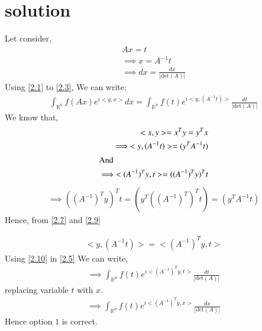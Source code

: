 \documentclass[journal,12pt,twocolumn]{IEEEtran}
\numberwithin{table}{section}
\begin{document}
	\section{solution}
Let consider,
\begin{align}
Ax = t \label{2.1}\\
\implies x = A^{-1}t \label{2.2}\\
\implies dx = \frac{dx}{ \left | \text{det} (A) \right |} \label{2.3}
\end{align}
Using  \eqref{2.1} to \eqref{2.3}, We can write: 
\begin{multline}
\int_{\mathbb{R}^n} f(Ax) e^{i<y,x>} dx  = \int_{\mathbb{R}^n} f(t) e^{i<y,(A^{-1}t)>} \frac{dt}{\left| \text{det}(A) \right|} \label{2.5}
\end{multline}
We know that,
\begin{align}
<x,y > = x^Ty = y^Tx\\
\implies <y, (A^{-1}t)> = (y^TA^{-1}t) \label{2.7}\\
\intertext{And}
\implies <(A^{-1})^{T}y,t> = ((A^{-1})^{T}y)^Tt
\end{align}
\begin{multline}
\implies   ((A^{-1})^Ty)^Tt = (y^T((A^{-1})^T)^Tt) = (y^TA^{-1}t) \label{2.9}
\end{multline}
Hence, from \eqref{2.7} and \eqref{2.9}

\begin{align}
<y, (A^{-1}t)>   = <(A^{-1})^{T}y,t>    \label{2.10}
\end{align}
Using \eqref{2.10} in \eqref{2.5} We can write,
\begin{align}
\implies \int_{\mathbb{R}^n} f(t) e^{i<(A^{-1})^{T}y,t>} \frac{dt}{\left| \text{det}(A) \right|}
\end{align}
replacing variable  $t$ with $x$.
\begin{align}
\implies \int_{\mathbb{R}^n} f(t) e^{i<(A^{-1})^{T}y,x>} \frac{dx}{\left| \text{det}(A) \right|}
\end{align}
Hence option $1$ is correct.
\end{document}
